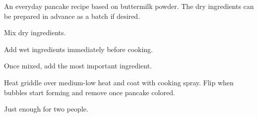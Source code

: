 
An everyday pancake recipe based on buttermilk powder. The dry ingredients can be prepared in advance as a batch if desired.


Mix dry ingredients.

\begin{ingredients}
\end{ingredients}

Add wet ingredients immediately before cooking.

\begin{ingredients}
\end{ingredients}

Once mixed, add the most important ingredient.

\begin{ingredients}
\end{ingredients}

Heat griddle over medium-low heat and coat with cooking spray. Flip when bubbles start forming and remove once pancake colored.

Just enough for two people.
